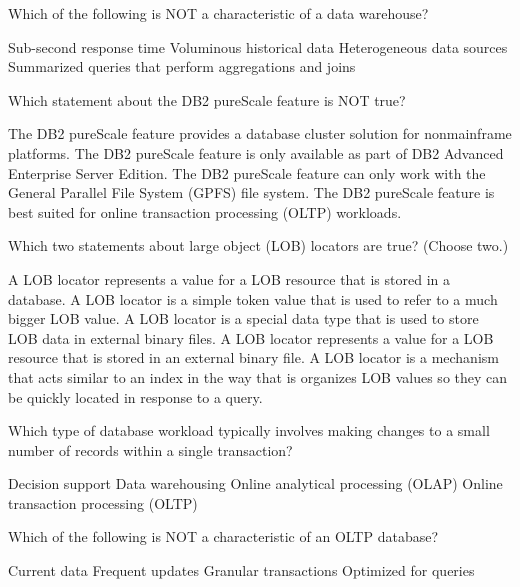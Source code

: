 \documentclass[answers, 11pt]{exam}
\begin{document}
\begin{questions}
\question[1]
Which of the following is NOT a characteristic of a data warehouse?
\begin{choices}
\choice Sub-second response time
\choice Voluminous historical data
\choice Heterogeneous data sources
\choice Summarized queries that perform aggregations and joins
\end{choices}

\newpage
\addpoints
\question[1]
Which statement about the DB2 pureScale feature is NOT true?
\begin{choices}
\choice The DB2 pureScale feature provides a database cluster solution for nonmainframe platforms.
\choice The DB2 pureScale feature is only available as part of DB2 Advanced Enterprise Server Edition.
\choice The DB2 pureScale feature can only work with the General Parallel File System (GPFS) file system.
\choice The DB2 pureScale feature is best suited for online transaction processing (OLTP) workloads.
\end{choices}

\question[1]
Which two statements about large object (LOB) locators are true? (Choose two.)
\begin{choices}
\choice A LOB locator represents a value for a LOB resource that is stored in a database.
\choice A LOB locator is a simple token value that is used to refer to a much bigger LOB value.
\choice A LOB locator is a special data type that is used to store LOB data in external binary files.
\choice A LOB locator represents a value for a LOB resource that is stored in an external binary file.
\choice A LOB locator is a mechanism that acts similar to an index in the way that is organizes LOB values
		so they can be quickly located in response to a query.
\end{choices}

\question[1]
Which type of database workload typically involves making changes to a small number of records within
a single transaction?
\begin{choices}
\choice Decision support
\choice Data warehousing
\choice Online analytical processing (OLAP)
\choice Online transaction processing (OLTP)
\end{choices}

\question[1]
Which of the following is NOT a characteristic of an OLTP database?
\begin{choices}
\choice Current data
\choice Frequent updates
\choice Granular transactions
\choice Optimized for queries
\end{choices}


\end{questions}
\end{document}

